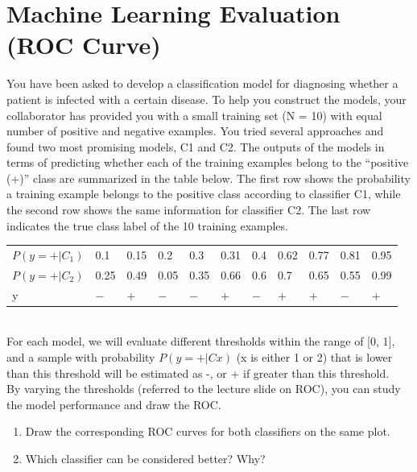 \documentclass{article}
\begin{document}
\section{Machine Learning Evaluation (ROC Curve)}

You have been asked to develop a classification model for diagnosing whether a patient is infected with a certain disease. To help you construct the models, your collaborator has provided you with a small training set (N = 10) with equal number of positive and negative examples. You tried several approaches and found two most promising models, C1 and C2. The outputs of the models in terms of predicting whether each of the training examples belong to the ``positive (+)'' class are summarized in the table below. The first row shows the probability a training example belongs to the positive class according to classifier C1, while the second row shows the same information for classifier C2. The last row indicates the true class label of the 10 training examples.
\\
\begin{table}[ht]
    \begin{tabular}{lllllllllll}
    $P(y=+|C_{1})$ & 0.1 & 0.15 & 0.2 & 0.3 & 0.31 & 0.4 & 0.62 & 0.77 & 0.81 & 0.95 \\
    $P(y=+|C_{2})$ & 0.25 & 0.49 & 0.05 & 0.35 & 0.66 & 0.6 & 0.7 & 0.65 & 0.55 & 0.99 \\
    y & $-$ & + & $-$ & $-$ & + & $-$ & + & + & $-$ & + 
    \end{tabular}
\end{table}
\\
For each model, we will evaluate different thresholds within the range of [0, 1], and a sample with probability $P(y = +|Cx)$ (x is either 1 or 2) that is lower than this threshold will be estimated as -, or + if greater than this threshold.
\\
By varying the thresholds (referred to the lecture slide on ROC), you can study the model performance and draw the ROC\@.

\begin{enumerate} [label= (\alph*)]
    \item Draw the corresponding ROC curves for both classifiers on the same plot.
    \item Which classifier can be considered better? Why?
\end{enumerate}
\end{document}
